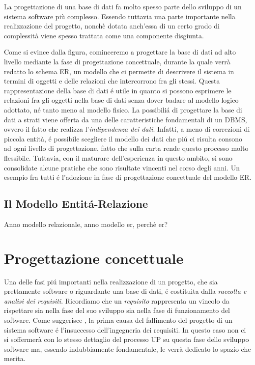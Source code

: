 \documentclass[12pt,a4paper,onecolumn]{article}
\begin{document}
	\begin{flushleft}
		La progettazione di una base di dati fa molto spesso parte dello sviluppo di un sistema software più complesso. Essendo tuttavia una parte importante nella realizzazione del progetto, nonchè dotata anch'essa di un certo grado di complessità viene spesso trattata come una componente disgiunta.
		
		Come si evince dalla figura, cominceremo a progettare la base di dati ad alto livello mediante la fase di progettazione concettuale, durante la quale verrà redatto lo schema ER, un modello che ci permette di descrivere il sistema in termini di oggetti e delle relazioni che intercorrono fra gli stessi. Questa rappresentazione della base di dati \'{e} utile in quanto si possono  esprimere le relazioni fra gli oggetti nella base di dati senza dover badare al modello logico adottato, n\'{e} tanto meno al modello fisico.\newline
		La possibili\'{a} di progettare la base di dati a strati viene offerta da una delle caratteristiche fondamentali di un DBMS, ovvero il fatto che realizza l'\textit{indipendenza dei dati}. Infatti, a meno di correzioni di piccola entità, \'{e} possibile scegliere il modello dei dati che pi\'{u} ci risulta consono ad ogni livello di progettazione, fatto che sulla carta rende questo processo molto flessibile. Tuttavia, con il maturare dell'esperienza in questo ambito, si sono consolidate alcune pratiche che sono risultate vincenti nel corso degli anni. Un esempio fra tutti \'{e} l'adozione in fase di progettazione concettuale del modello ER.\newpage
	\end{flushleft}

\subsection{Il Modello Entit\'{a}-Relazione}
	\begin{flushleft}
		Anno modello relazionale, anno modello er, perchè er?
	\end{flushleft}


\newpage

\section{Progettazione concettuale}

	Una delle fasi pi\'{u} importanti nella realizzazione di un progetto, che sia prettamente software o riguardante una base di dati, \'{e} costituita dalla \textit{raccolta e analisi dei requisiti}. Ricordiamo che un \textit{requisito} rappresenta un vincolo da rispettare sia nella fase del suo sviluppo sia nella fase di funzionamento del software. Come suggerisce \cite{Arlow}, la prima causa del fallimento del progetto di un sistema software \'{e} l'insuccesso dell'ingegneria dei requisiti. In questo caso non ci si soffermerà con lo stesso dettaglio del processo UP su questa fase dello sviluppo software ma, essendo indubbiamente fondamentale, le verrà dedicato lo spazio che merita.
	\newline
	
\end{document}
